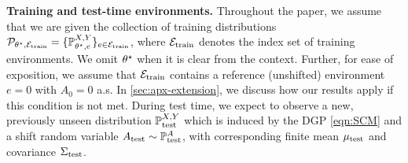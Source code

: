 \textbf{Training and test-time environments.} 
Throughout the paper, we assume that we are given the collection of training distributions $\mathcal{P}_{\theta^{\star}, \mathcal{E}_{\mathrm{train}}} = \{ \mathbb{P}^{X,Y}_{\theta^{\star}, e} \}_{e \in \mathcal{E}_{\mathrm{train}}}$, where $\mathcal{E}_{\mathrm{train}}$ denotes the index set of training environments. We omit $\theta^{\star}$ when it is clear from the context. Further, for ease of exposition, we  assume that $\mathcal{E}_{\mathrm{train}}$ contains a reference (unshifted) environment $e = 0$ with $A_0 = 0$ a.s. In \cref{sec:apx-extension}, we discuss how our results apply if this condition is not met.
During test time, we expect to observe a new, previously unseen distribution $\mathbb{P}_{\mathrm{test}}^{X,Y}$ which is induced by the DGP \eqref{eqn:SCM} and a shift random variable $A_{\text{test}} \sim \mathbb{P}^A_{\mathrm{test}}$, with corresponding finite mean $\mu_{\text{test}}$  and covariance $\Sigma_{\text{test}}$.

